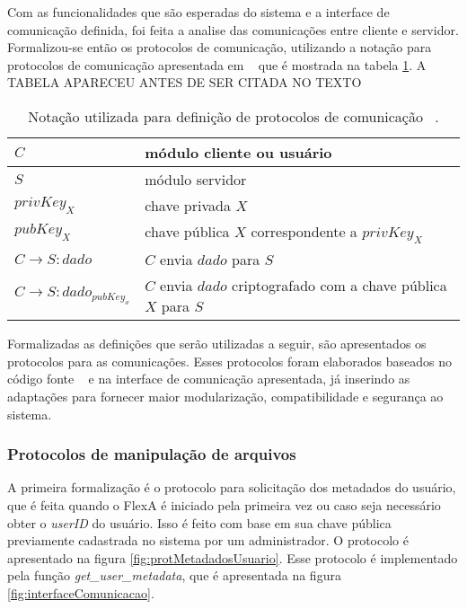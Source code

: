         Com as funcionalidades que são esperadas do sistema e a interface de comunicação definida, foi feita a analise das comunicações entre cliente e servidor. Formalizou-se então os protocolos de comunicação, utilizando a notação para protocolos de comunicação apresentada em ~\cite{ross} que é mostrada na tabela \ref{tab:notacao}.  A TABELA APARECEU ANTES DE SER CITADA NO TEXTO
        
        \begin{table}
        
        \centering
        \begin{tabular}{|l|l|}
        \hline
        
        $C$ & módulo cliente ou usuário \\
        \hline
        $S$ & módulo servidor \\
        \hline
        $privKey_{X}$ & chave privada $X$ \\
        \hline
        $pubKey_{X}$ & chave pública $X$ correspondente a $privKey_{X}$\\
        \hline
        $C \rightarrow S : dado$ & $C$ envia $dado$ para $S$\\
        \hline
        $C \rightarrow S : {dado}_{pubKey_{x}}$ & $C$ envia $dado$ criptografado com a chave pública $X$ para $S$\\
        \hline

        \end{tabular}
        \caption{Notação utilizada para definição de protocolos de comunicação ~\cite{ross}.}
        \label{tab:notacao}
        \end{table}
        
        Formalizadas as definições que serão utilizadas a seguir, são apresentados os protocolos para as comunicações. Esses protocolos foram elaborados baseados no código fonte ~\cite{mario} e na interface de comunicação apresentada, já inserindo as adaptações para fornecer maior modularização, compatibilidade e segurança ao sistema.
        
        \subsubsection{Protocolos de manipulação de arquivos}
        
        A primeira formalização é o protocolo para solicitação dos metadados do usuário, que é feita quando o FlexA é iniciado pela primeira vez ou caso seja necessário obter o \textit{userID} do usuário. Isso é feito com base em sua chave pública previamente cadastrada no sistema por um administrador. O protocolo é apresentado na figura \ref{fig:protMetadadosUsuario}. Esse protocolo é implementado pela função \textit{get\_user\_metadata}, que é apresentada na figura \ref{fig:interfaceComunicacao}.
        
